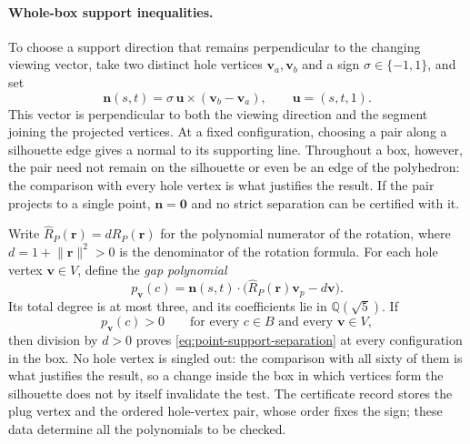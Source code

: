 \paragraph{Whole-box support inequalities.}
To choose a support direction that remains perpendicular to the changing
viewing vector, take two distinct hole vertices $\mathbf v_a,\mathbf v_b$
and a sign $\sigma\in\{-1,1\}$, and set
\begin{equation}\label{eq:moving-support-direction}
  \mathbf n(s,t)=\sigma\,\mathbf u\times(\mathbf v_b-\mathbf v_a),
  \qquad \mathbf u=(s,t,1).
\end{equation}
This vector is perpendicular to both the viewing direction and the
segment joining the projected vertices. At a fixed configuration, choosing a pair along a
silhouette edge gives a normal to its supporting line. Throughout a box,
however, the pair need not remain on the silhouette or even be an edge of
the polyhedron: the comparison with every hole vertex is what justifies the result.
If the pair projects to a single point, $\mathbf n=\mathbf0$ and no strict
separation can be certified with it.

Write $\widehat R_P(\mathbf r)=dR_P(\mathbf r)$ for the polynomial
numerator of the rotation, where $d=1+\lVert\mathbf r\rVert^2>0$
is the denominator of the rotation formula.
For each hole vertex $\mathbf v\in V$, define the \emph{gap polynomial}
\begin{equation}\label{eq:support-gap-polynomial}
  p_{\mathbf v}(c)=\mathbf n(s,t)\cdot
    \bigl(\widehat R_P(\mathbf r)\mathbf v_p-d\mathbf v\bigr).
\end{equation}
Its total degree is at most three, and its coefficients lie in
$\mathbb Q(\sqrt5)$. If
\begin{equation}\label{eq:whole-box-support-condition}
  p_{\mathbf v}(c)>0
  \qquad\text{for every }c\in B\text{ and every }\mathbf v\in V,
\end{equation}
then division by $d>0$ proves \cref{eq:point-support-separation}
at every configuration in the box. No hole vertex is singled out: the
comparison with all sixty of them is what justifies the result, so a change
inside the box in which vertices form the silhouette does not by itself
invalidate the test. The certificate record stores the plug vertex and the
ordered hole-vertex pair, whose order fixes the sign; these data determine
all the polynomials to be checked.

